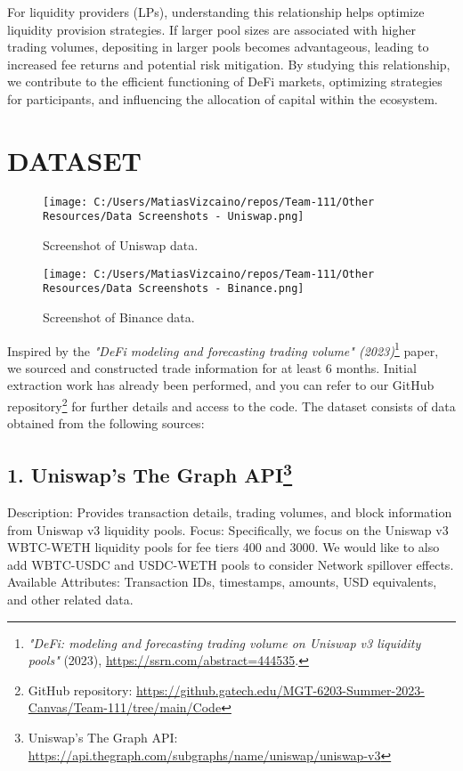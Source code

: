 \documentclass{article}
\begin{document}
{For liquidity providers (LPs), understanding this relationship helps optimize liquidity provision strategies. If larger pool sizes are associated with higher trading volumes, depositing in larger pools becomes advantageous, leading to increased fee returns and potential risk mitigation. By studying this relationship, we contribute to the efficient functioning of DeFi markets, optimizing strategies for participants, and influencing the allocation of capital within the ecosystem.

\newpage
\section*{DATASET}

\begin{wrapfigure}[8]{r}{0.2\textwidth}
\vspace{-40pt} %
\centering
\texttt{[image: C:/Users/MatiasVizcaino/repos/Team-111/Other Resources/Data Screenshots - Uniswap.png]}
\caption{Screenshot of Uniswap data.}
\label{fig:uniswap-screenshot}
\vspace{3pt} %
\texttt{[image: C:/Users/MatiasVizcaino/repos/Team-111/Other Resources/Data Screenshots - Binance.png]}
\caption{Screenshot of Binance data.}
\label{fig:binance-screenshot}
\end{wrapfigure}

Inspired by the \textit{"DeFi modeling and forecasting trading volume" (2023)}\footnote{\textit{"DeFi: modeling and forecasting trading volume on Uniswap v3 liquidity pools"} (2023), \url{https://ssrn.com/abstract=444535}.} paper, we sourced and constructed trade information for at least 6 months. Initial extraction work has already been performed, and you can refer to our GitHub repository\footnote{GitHub repository: \url{https://github.gatech.edu/MGT-6203-Summer-2023-Canvas/Team-111/tree/main/Code}} for further details and access to the code. The dataset consists of data obtained from the following sources:


\subsection*{1. Uniswap's The Graph API\footnote{Uniswap's The Graph API: \url{https://api.thegraph.com/subgraphs/name/uniswap/uniswap-v3}}}
\begin{minipage}[t]{0.78\textwidth}
Description: Provides transaction details, trading volumes, and block information from Uniswap v3 liquidity pools.
Focus: Specifically, we focus on the Uniswap v3 WBTC-WETH liquidity pools for fee tiers 400 and 3000. We would like to also add WBTC-USDC and USDC-WETH pools to consider Network spillover effects.
Available Attributes: Transaction IDs, timestamps, amounts, USD equivalents, and other related data.
\end{minipage}

}
\end{document}
